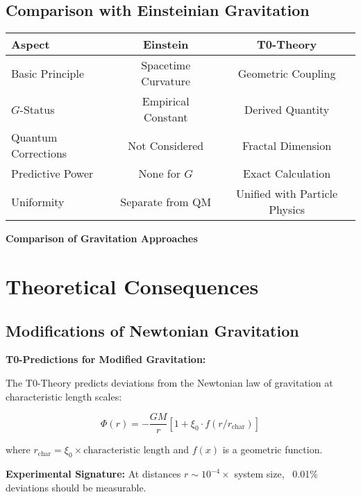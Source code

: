 \documentclass[12pt,a4paper]{article}
\begin{document}
	\subsection{Comparison with Einsteinian Gravitation}
	
	\begin{center}
		\begin{tabular}{lcc}
			\toprule
			\textbf{Aspect} & \textbf{Einstein} & \textbf{T0-Theory} \\
			\midrule
			Basic Principle & Spacetime Curvature & Geometric Coupling \\
			$G$-Status & Empirical Constant & Derived Quantity \\
			Quantum Corrections & Not Considered & Fractal Dimension \\
			Predictive Power & None for $G$ & Exact Calculation \\
			Uniformity & Separate from QM & Unified with Particle Physics \\
			\bottomrule
		\end{tabular}
		\par\vspace{0.5em}
		\textbf{Comparison of Gravitation Approaches}
	\end{center}
	
	\section{Theoretical Consequences}
	
	\subsection{Modifications of Newtonian Gravitation}
	
	\begin{warning}
		\textbf{T0-Predictions for Modified Gravitation:}
		
		The T0-Theory predicts deviations from the Newtonian law of gravitation at characteristic length scales:
		
		\begin{equation}
			\Phi(r) = -\frac{GM}{r} \left[1 + \xi_0 \cdot f(r/r_{\text{char}})\right]
		\end{equation}
		
		where $r_{\text{char}} = \xi_0 \times \text{characteristic length}$ and $f(x)$ is a geometric function.
		
		\textbf{Experimental Signature:} At distances $r \sim 10^{-4} \times$ system size, ~0.01\% deviations should be measurable.
	\end{warning}
	
\end{document}
